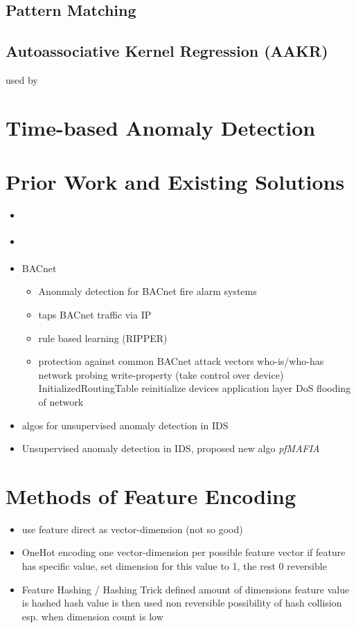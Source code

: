 	\subsection{Pattern Matching}
	\subsection{Autoassociative Kernel Regression (AAKR)}
		used by \textcite{Yang2006}

\section{Time-based Anomaly Detection}

\section{Prior Work and Existing Solutions}
\begin{itemize}
	\item \parencite{Yang2006}
	\item \parencite{Celeda2012}
	\item \textcite{Pan2014} BACnet
		\begin{itemize}
			\item Anonmaly detection for BACnet fire alarm systems
			\item taps BACnet traffic via IP
			\item rule based learning (RIPPER)
			\item protection against common BACnet attack vectors
				\subitem who-is/who-has network probing
				\subitem write-property (take control over device)
				\subitem InitializedRoutingTable
				\subitem reinitialize devices
				\subitem application layer DoS
				\subitem flooding of network
		\end{itemize}
	
	\item \textcite{Eskin2002} algos for unsupervised anomaly detection in IDS
	\item \textcite{Leung2005} Unsupervised anomaly detection in IDS, proposed new algo \emph{pfMAFIA}
\end{itemize}

\section{Methods of Feature Encoding}
\begin{itemize}
	\item use feature direct as vector-dimension (not so good)
	\item OneHot encoding
		\subitem one vector-dimension per possible feature vector
		\subitem if feature has specific value, set dimension for this value to 1, the rest 0
		\subitem reversible
	\item Feature Hashing / Hashing Trick
		\subitem defined amount of dimensions
		\subitem feature value is hashed
		\subitem hash value is then used
		\subitem non reversible
		\subitem possibility of hash collision
		\subitem esp. when dimension count is low
		
\end{itemize}